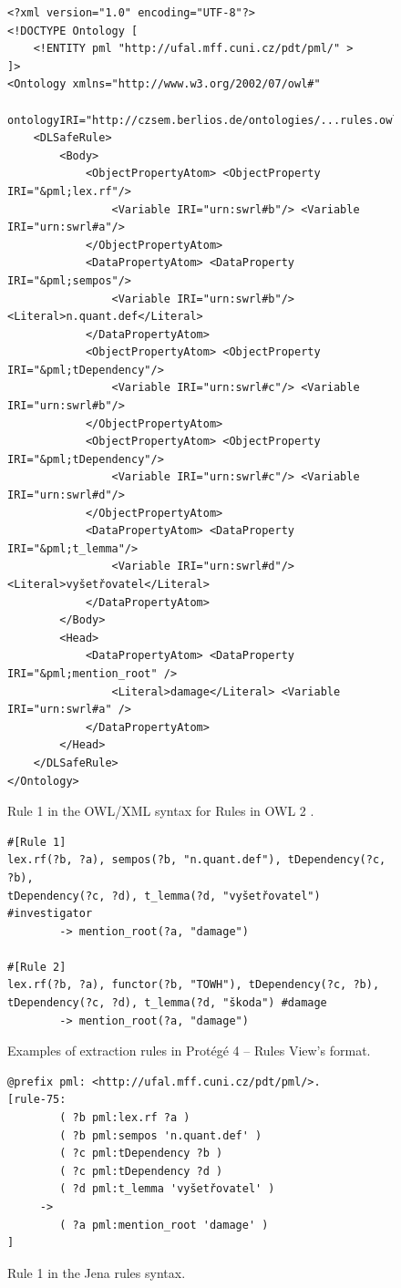 \begin{figure}
\begin{verbatim}
<?xml version="1.0" encoding="UTF-8"?>
<!DOCTYPE Ontology [
	<!ENTITY pml "http://ufal.mff.cuni.cz/pdt/pml/" >
]>
<Ontology xmlns="http://www.w3.org/2002/07/owl#"
	ontologyIRI="http://czsem.berlios.de/ontologies/...rules.owl">
	<DLSafeRule>
		<Body>
			<ObjectPropertyAtom> <ObjectProperty IRI="&pml;lex.rf"/>
				<Variable IRI="urn:swrl#b"/> <Variable IRI="urn:swrl#a"/>
			</ObjectPropertyAtom>
			<DataPropertyAtom> <DataProperty IRI="&pml;sempos"/>
				<Variable IRI="urn:swrl#b"/> <Literal>n.quant.def</Literal>
			</DataPropertyAtom>
			<ObjectPropertyAtom> <ObjectProperty IRI="&pml;tDependency"/>
				<Variable IRI="urn:swrl#c"/> <Variable IRI="urn:swrl#b"/>
			</ObjectPropertyAtom>
			<ObjectPropertyAtom> <ObjectProperty IRI="&pml;tDependency"/>
				<Variable IRI="urn:swrl#c"/> <Variable IRI="urn:swrl#d"/>
			</ObjectPropertyAtom>
			<DataPropertyAtom> <DataProperty IRI="&pml;t_lemma"/>
				<Variable IRI="urn:swrl#d"/> <Literal>vyšetřovatel</Literal>
			</DataPropertyAtom>
		</Body>
		<Head>
			<DataPropertyAtom> <DataProperty IRI="&pml;mention_root" />
				<Literal>damage</Literal> <Variable IRI="urn:swrl#a" />
			</DataPropertyAtom>
		</Head>
	</DLSafeRule>
</Ontology>
\end{verbatim}
\caption{Rule 1 in the OWL/XML syntax for Rules in OWL 2 \citep{GHPP09a}.}
\label{fig:rules_xml}
\end{figure}


\begin{figure}
\begin{verbatim}
#[Rule 1]
lex.rf(?b, ?a), sempos(?b, "n.quant.def"), tDependency(?c, ?b),
tDependency(?c, ?d), t_lemma(?d, "vyšetřovatel") #investigator
		-> mention_root(?a, "damage")

#[Rule 2]
lex.rf(?b, ?a), functor(?b, "TOWH"), tDependency(?c, ?b),
tDependency(?c, ?d), t_lemma(?d, "škoda") #damage
		-> mention_root(?a, "damage")
\end{verbatim}
	\caption{Examples of extraction rules in Prot\'{e}g\'{e} 4 -- Rules View's format.}
	\label{fig:rules_protege}
\end{figure}



\begin{figure}
\begin{verbatim}
@prefix pml: <http://ufal.mff.cuni.cz/pdt/pml/>.
[rule-75:  
        ( ?b pml:lex.rf ?a )
        ( ?b pml:sempos 'n.quant.def' )
        ( ?c pml:tDependency ?b )
        ( ?c pml:tDependency ?d )
        ( ?d pml:t_lemma 'vyšetřovatel' )
     -> 
        ( ?a pml:mention_root 'damage' )
]
\end{verbatim}
\caption{Rule 1 in the Jena rules syntax.}
\label{fig:rules_jena}
\end{figure}


